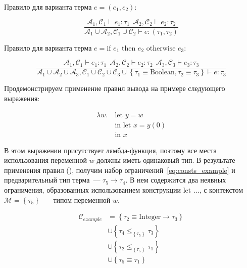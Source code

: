 Правило для варианта терма $e = (e_1, e_2)$:

\begin{equation}
    \label{eq:tuple_infer}
    \frac{
        \mathcal{A}_1, \mathcal{C}_1 \vdash e_1: \tau_1 ~~ \mathcal{A}_2, \mathcal{C}_2 \vdash e_2: \tau_2
    }{
        \mathcal{A}_1 \cup \mathcal{A}_2, \mathcal{C}_1 \cup \mathcal{C}_2 \vdash e: (\tau_1, \tau_2)
    }
\end{equation}

Правило для варианта терма $e = \text{if } e_1 \text{ then } e_2 \text{ otherwise } e_3$:

\begin{equation}
    \label{eq:if_infer}
    \frac{
        \mathcal{A}_1, \mathcal{C}_1 \vdash e_1: \tau_1 ~~ \mathcal{A}_2, \mathcal{C}_2 \vdash e_2: \tau_2 ~~ \mathcal{A}_3, \mathcal{C}_3 \vdash e_3: \tau_3
    }{
        \mathcal{A}_1 \cup \mathcal{A}_2 \cup \mathcal{A}_3, \mathcal{C}_1 \cup \mathcal{C}_2 \cup \mathcal{C}_3 \cup \left\{ \tau_1 \equiv \text{Boolean}, \tau_2 \equiv \tau_3 \right\} \vdash e: \tau_3
    }
\end{equation}

Продемонстрируем применение правил вывода на примере следующего выражения:

\begin{equation}
    \label{eq:expr_example}
    \begin{aligned}
        \lambda w. ~&\text{let } y = w \\
        &\text{in let } x = y(0) \\
        &\text{in } x
    \end{aligned}
\end{equation}

В этом выражении присутствует лямбда-функция, поэтому все места использования переменной $w$ должны иметь одинаковый тип.
В результате применения правил (), получим набор ограничений~\ref{eq:consts_example} и предварительный тип терма~--- $\tau_5 \to \tau_4$.
В нем содержится два неявных ограничения, образованных использованием конструкции $\text{let } \ldots$, с контекстом $\mathcal{M} = \left\{ \tau_5 \right\}$~--- типом переменной $w$.

\begin{equation}
    \label{eq:consts_example}
    \begin{aligned}
        \mathcal{C}_{example} &= \left\{ \tau_2 \equiv \text{Integer} \to \tau_3 \right\} \\
        &\cup \left\{ \tau_4 \leq_{\left\{ \tau_5 \right\}} \tau_3 \right\} \\
        &\cup \left\{ \tau_2 \leq_{\left\{ \tau_5 \right\}} \tau_1 \right\} \\
        &\cup \left\{ \tau_5 \equiv \tau_1 \right\}
    \end{aligned}
\end{equation}


